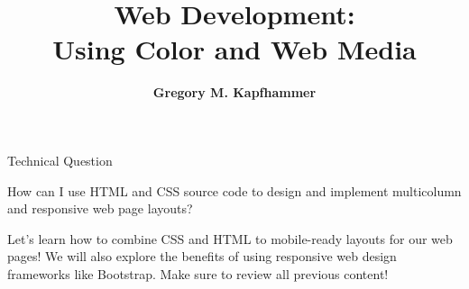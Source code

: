 \documentclass[14pt,aspectratio=169]{beamer}
\title{Web Development: \\ Using Color and Web Media}
\author{{\bf Gregory M. Kapfhammer}}
\institute[shortinst]{{\bf Department of Computer Science, Allegheny College}}
\begin{document}
{
  \begin{frame}
    \titlepage
  \end{frame}
}

%
\begin{frame}{Technical Question}
  \hspace*{.25in}
  \vspace*{.2in}
  \begin{minipage}{5in}
    \begin{center}
      {\large How can I use HTML and CSS source code to design and implement
      multicolumn and responsive web page layouts?}
    \end{center}
  \end{minipage}
  \vspace{2ex}
  \begin{center}
    \small Let's learn how to combine CSS and HTML to mobile-ready layouts for
    our web pages! We will also explore the benefits of using responsive web
    design frameworks like Bootstrap. Make sure to review all previous
    content!\\
  \end{center}
\end{frame}
\end{document}
